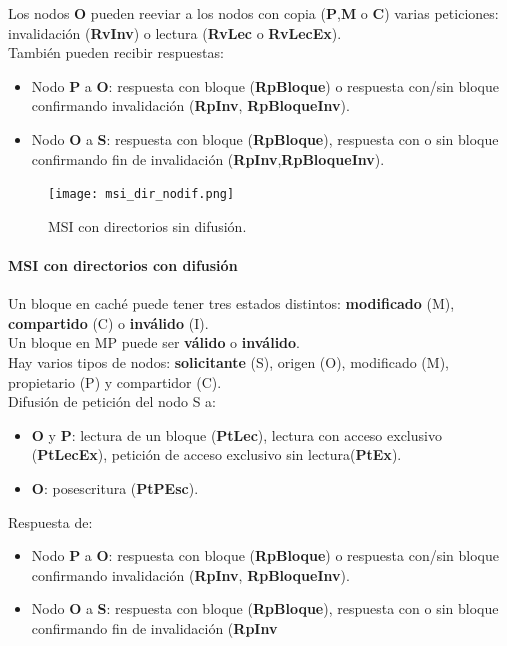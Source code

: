 \documentclass[12pt,spanish]{article}
\begin{document}
Los nodos \textbf{O} pueden reeviar a los nodos con copia (\textbf{P},\textbf{M} o \textbf{C}) varias peticiones: invalidación (\textbf{RvInv}) o lectura (\textbf{RvLec} o \textbf{RvLecEx}).\\

También pueden recibir respuestas:
\begin{itemize}
	\item Nodo \textbf{P} a \textbf{O}: respuesta con bloque (\textbf{RpBloque}) o respuesta con/sin bloque confirmando invalidación (\textbf{RpInv}, \textbf{RpBloqueInv}).
	\item Nodo \textbf{O} a \textbf{S}: respuesta con bloque (\textbf{RpBloque}), respuesta con o sin bloque confirmando fin de invalidación (\textbf{RpInv},\textbf{RpBloqueInv}).
\end{itemize}

\begin{figure}[H]
\centering
\texttt{[image: msi\_dir\_nodif.png]}
\caption{MSI con directorios sin difusión.}
\end{figure}

\paragraph{MSI con directorios con difusión}

Un bloque en caché puede tener tres estados distintos: \textbf{modificado} (M), \textbf{compartido} (C) o \textbf{inválido} (I).\\

Un bloque en MP puede ser \textbf{válido} o \textbf{inválido}.\\

Hay varios tipos de nodos: \textbf{solicitante} (S), origen (O), modificado (M), propietario (P) y compartidor (C).\\

Difusión de petición del nodo S a:
\begin{itemize}
	\item \textbf{O} y \textbf{P}: lectura de un bloque (\textbf{PtLec}), lectura con acceso exclusivo (\textbf{PtLecEx}), petición de acceso exclusivo sin lectura(\textbf{PtEx}).
	\item \textbf{O}: posescritura (\textbf{PtPEsc}).
\end{itemize}

Respuesta de:

\begin{itemize}
	\item Nodo \textbf{P} a \textbf{O}: respuesta con bloque (\textbf{RpBloque}) o respuesta con/sin bloque confirmando invalidación (\textbf{RpInv}, \textbf{RpBloqueInv}).
	\item Nodo \textbf{O} a \textbf{S}: respuesta con bloque (\textbf{RpBloque}), respuesta con o sin bloque confirmando fin de invalidación (\textbf{RpInv}
\end{itemize}
\end{document}

